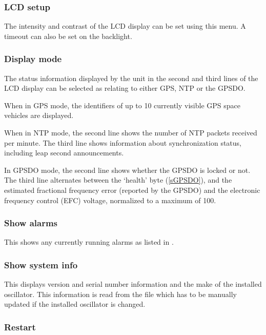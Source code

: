 \subsubsection{LCD setup}

The intensity and contrast of the LCD display can be set using this menu.
A timeout can also be set on the backlight.

\subsubsection{Display mode \label{ss:DisplayMode}}

The status information displayed by the unit in the second and third lines of the LCD display
can be selected as relating to either GPS, NTP or the GPSDO.

When in GPS mode, the identifiers of up
to 10 currently visible GPS space vehicles are displayed. 

When in NTP mode, the second line shows
the number of NTP packets received per minute. The third line shows information about
synchronization status, including leap second announcements.

In GPSDO mode, the second line shows whether the GPSDO is locked or not. 
The third line alternates between the `health' byte (\ref{sGPSDO}), and the estimated fractional frequency error 
(reported by the GPSDO) and the electronic frequency control (EFC) voltage, normalized to a maximum of 100.

\subsubsection{Show alarms}

This shows any currently running alarms as listed in .

\subsubsection{Show system info}

This displays version and serial number information and the make of the installed oscillator.
This information is read from the file  which has to be manually
updated if the installed oscillator is changed.
  
\subsubsection{Restart}

